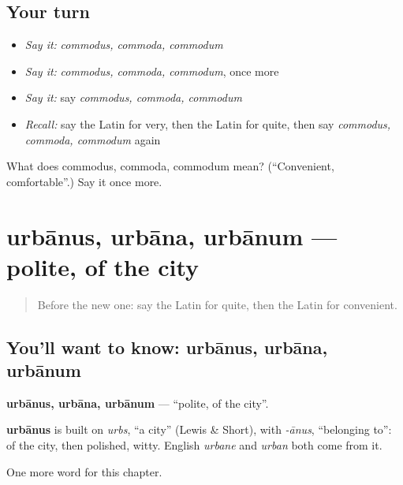 \subsection*{Your turn}
\begin{itemize}
\raggedright
  \item \emph{Say it:} \emph{commodus, commoda, commodum}
  \item \emph{Say it:} \emph{commodus, commoda, commodum}, once more
  \item \emph{Say it:} say \emph{commodus, commoda, commodum}
  \item \emph{Recall:} say the Latin for very, then the Latin for quite, then say \emph{commodus, commoda, commodum} again
\end{itemize}

\begin{tcolorbox}[breakable,colback=teal!4,colframe=teal!35!black,title={Before you move on}]
What does commodus, commoda, commodum mean? (\textquotedblleft{}Convenient, comfortable\textquotedblright{}.) Say it once more.
\end{tcolorbox}
\section[urbānus, urbāna, urbānum]{urbānus, urbāna, urbānum — polite, of the city}

\label{lesson:LA-C180-urbanus}



\begin{quote}
Before the new one: say the Latin for quite, then the Latin for convenient.
\end{quote}

\subsection*{You'll want to know: urbānus, urbāna, urbānum}
\textbf{urbānus, urbāna, urbānum} — \textquotedblleft{}polite, of the city\textquotedblright{}.

\begin{cousinweb}
\textbf{urbānus} is built on \emph{urbs}, \textquotedblleft{}a city\textquotedblright{} (Lewis \& Short), with \emph{-ānus}, \textquotedblleft{}belonging to\textquotedblright{}: of the city, then polished, witty. English \emph{urbane} and \emph{urban} both come from it.
\end{cousinweb}

\begin{grammarlens}[title={What you've built}]
One more word for this chapter.
\end{grammarlens}


